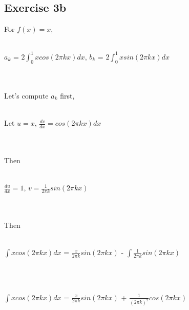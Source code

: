 \documentclass[11pt]{article} %
\begin{document}
\subsection{Exercise 3b}
For $f(x)=x$,\\\\
\centerline{$a_{k}$ = $2\int_{0}^{1}xcos(2\pi k x)dx$, $b_{k}$ = $2\int_{0}^{1}xsin(2\pi k x)dx$}\\\\
Let's compute $a_{k}$ first,\\\\
\centerline{Let $u = x$, $\frac{dv}{dx} = cos(2\pi k x)dx$}\\\\
Then\\\\
\centerline{$\frac{du}{dx} = 1$, $v = \frac{1}{2\pi k}sin(2\pi k x)$}\\\\
Then\\\\
\centerline{$\int xcos(2\pi k x)dx$ = $\frac{x}{2\pi k}sin(2\pi k x)$ - $\int \frac{1}{2\pi k}sin(2\pi k x)$}\\\\
\centerline{$\int xcos(2\pi k x)dx$ = $\frac{x}{2\pi k}sin(2\pi k x)$ + $ \frac{1}{(2\pi k)^{2}}cos(2\pi k x)$}\\\\
\end{document}
